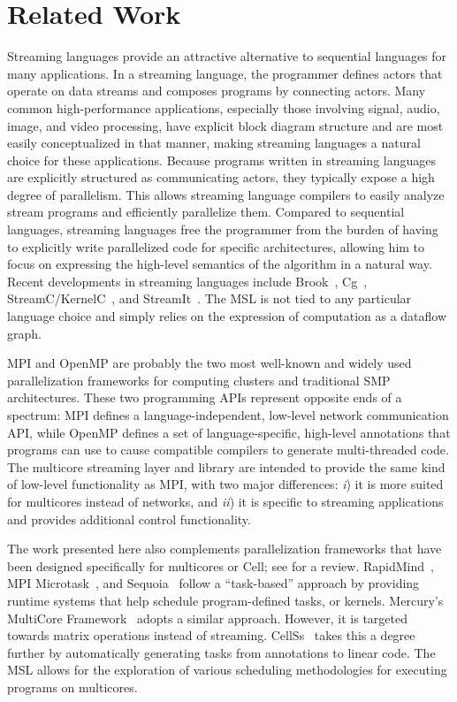 \section{Related Work}\label{ch:bg}

Streaming languages provide an attractive alternative to sequential
languages for many applications. In a streaming language, the
programmer defines actors that operate on data streams and composes
programs by connecting actors. Many common high-performance
applications, especially those involving signal, audio, image, and
video processing, have explicit block diagram structure and are most
easily conceptualized in that manner, making streaming languages a
natural choice for these applications.
Because programs written in streaming languages are explicitly
structured as communicating actors, they typically expose a high
degree of parallelism. This allows streaming language compilers to
easily analyze stream programs and efficiently parallelize
them. Compared to sequential languages, streaming languages free the
programmer from the burden of having to explicitly write parallelized
code for specific architectures, allowing him to focus on expressing
the high-level semantics of the algorithm in a natural way.
Recent developments in streaming languages include Brook~\cite{brook},
Cg~\cite{cg}, StreamC/KernelC~\cite{streamc}, and StreamIt~\cite{streamitweb}.
The MSL is not tied to any particular language choice and simply
relies on the expression of computation as a dataflow graph.
 
MPI and OpenMP are probably the two most well-known and widely used
parallelization frameworks for computing clusters and traditional SMP
architectures. These two programming APIs represent opposite ends of a
spectrum: MPI defines a language-independent, low-level network
communication API, while OpenMP defines a set of language-specific,
high-level annotations that programs can use to cause compatible
compilers to generate multi-threaded code.  The multicore streaming
layer and library are intended to provide the same kind of low-level
functionality as MPI, with two major differences: \emph{i}) it is more
suited for multicores instead of networks, and \emph{ii}) it is
specific to streaming applications and provides additional control
functionality.

The work presented here also complements parallelization frameworks
that have been designed specifically for multicores or Cell; see
\cite{cell:pf} for a review. RapidMind~\cite{rapidmind}, MPI
Microtask~\cite{mpimicrotask}, and Sequoia~\cite{sequoia} follow a
``task-based'' approach by providing runtime systems that help
schedule program-defined tasks, or kernels. Mercury's MultiCore
Framework~\cite{mcf} adopts a similar approach. However, it is
targeted towards matrix operations instead of streaming.
CellSs~\cite{cellss} takes
this a degree further by automatically generating tasks from
annotations to linear code. The MSL allows for the exploration of
various scheduling methodologies for executing programs on multicores.

